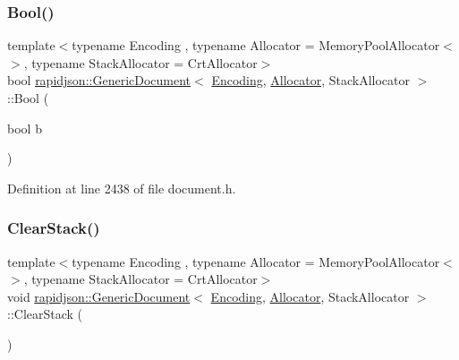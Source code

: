 \subsubsection{\texorpdfstring{Bool()}{Bool()}}
{\footnotesize\ttfamily template$<$typename Encoding , typename Allocator  = Memory\+Pool\+Allocator$<$$>$, typename Stack\+Allocator  = Crt\+Allocator$>$ \\
bool \mbox{\hyperlink{classrapidjson_1_1_generic_document}{rapidjson\+::\+Generic\+Document}}$<$ \mbox{\hyperlink{classrapidjson_1_1_encoding}{Encoding}}, \mbox{\hyperlink{classrapidjson_1_1_allocator}{Allocator}}, Stack\+Allocator $>$\+::Bool (\begin{DoxyParamCaption}\item[{bool}]{b }\end{DoxyParamCaption})}



Definition at line 2438 of file document.\+h.


\begin{DoxyCode}{0}

\end{DoxyCode}
\mbox{\label{classrapidjson_1_1_generic_document_aadd2423ddd54a26e915803fa5b7d8416}} 
\subsubsection{\texorpdfstring{ClearStack()}{ClearStack()}}
{\footnotesize\ttfamily template$<$typename Encoding , typename Allocator  = Memory\+Pool\+Allocator$<$$>$, typename Stack\+Allocator  = Crt\+Allocator$>$ \\
void \mbox{\hyperlink{classrapidjson_1_1_generic_document}{rapidjson\+::\+Generic\+Document}}$<$ \mbox{\hyperlink{classrapidjson_1_1_encoding}{Encoding}}, \mbox{\hyperlink{classrapidjson_1_1_allocator}{Allocator}}, Stack\+Allocator $>$\+::Clear\+Stack (\begin{DoxyParamCaption}{ }\end{DoxyParamCaption})\hspace{0.3cm}{\ttfamily [private]}}



